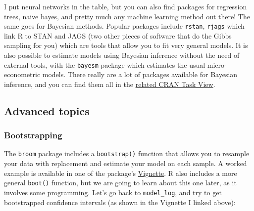 \documentclass[]{gitbook}
\newenvironment{Shaded}{\begin{snugshade}}{\end{snugshade}}
\newcommand{\DataTypeTok}[1]{\textcolor[rgb]{0.13,0.29,0.53}{#1}}
\newcommand{\DecValTok}[1]{\textcolor[rgb]{0.00,0.00,0.81}{#1}}
\newcommand{\KeywordTok}[1]{\textcolor[rgb]{0.13,0.29,0.53}{\textbf{#1}}}
\newcommand{\NormalTok}[1]{#1}
\newcommand{\OperatorTok}[1]{\textcolor[rgb]{0.81,0.36,0.00}{\textbf{#1}}}
\newcommand{\StringTok}[1]{\textcolor[rgb]{0.31,0.60,0.02}{#1}}
\theoremstyle{definition}
\theoremstyle{definition}
\theoremstyle{definition}
\theoremstyle{remark}
\begin{document}
I put neural networks in the table, but you can also find packages for
regression trees, naive bayes, and pretty much any machine learning
method out there! The same goes for Bayesian methods. Popular packages
include \texttt{rstan}, \texttt{rjags} which link R to STAN and JAGS
(two other pieces of software that do the Gibbs sampling for you) which
are tools that allow you to fit very general models. It is also possible
to estimate models using Bayesian inference without the need of external
tools, with the \texttt{bayesm} package which estimates the usual
micro-econometric models. There really are a lot of packages available
for Bayesian inference, and you can find them all in the
\href{https://cran.r-project.org/web/views/Bayesian.html}{related CRAN
Task View}.

\hypertarget{advanced-topics}{%
\subsection{Advanced topics}\label{advanced-topics}}

\hypertarget{bootstrapping}{%
\subsubsection{Bootstrapping}\label{bootstrapping}}

The \texttt{broom} package includes a \texttt{bootstrap()} function that
allows you to resample your data with replacement and estimate your
model on each sample. A worked example is available in one of the
package's
\href{https://cran.r-project.org/web/packages/broom/vignettes/bootstrapping.html}{Vignette}.
R also includes a more general \texttt{boot()} function, but we are
going to learn about this one later, as it involves some programming.
Let's go back to \texttt{model\_log}, and try to get bootstrapped
confidence intervals (as shown in the Vignette I linked above):

\begin{Shaded}
\end{Shaded}
\end{document}
